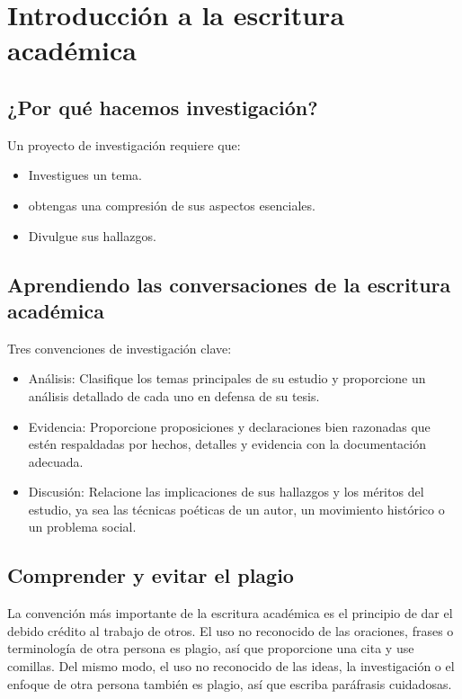 \chapter{Introducción a la escritura académica}

\section{¿Por qué hacemos investigación?}
Un proyecto de investigación requiere que:
\begin{itemize}
    \item Investigues un tema.
    \item obtengas una compresión de sus aspectos esenciales.
    \item Divulgue sus hallazgos.
\end{itemize}

\section{Aprendiendo las conversaciones de la escritura académica}

Tres convenciones de investigación clave:
\begin{itemize}
    \item Análisis: Clasifique los temas principales de su estudio y proporcione un análisis detallado de cada uno en defensa de su tesis.
    \item Evidencia: Proporcione proposiciones y declaraciones bien razonadas que estén respaldadas por hechos, detalles y evidencia con la documentación adecuada. 
    \item Discusión: Relacione las implicaciones de sus hallazgos y los méritos del estudio, ya sea las técnicas poéticas de un autor, un movimiento histórico o un problema social.
\end{itemize}

\section{Comprender y evitar el plagio}
La convención más importante de la escritura académica es el principio de dar el debido crédito al trabajo de otros. El uso no reconocido de las oraciones, frases o terminología de otra persona es plagio, así que proporcione una cita y use comillas. Del mismo modo, el uso no reconocido de las ideas, la investigación o el enfoque de otra persona también es plagio, así que escriba paráfrasis cuidadosas.

